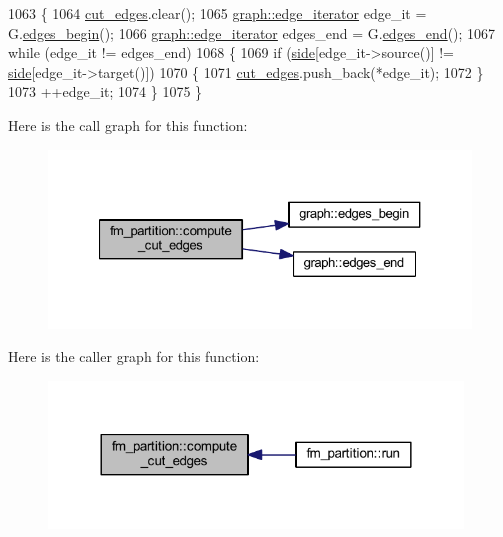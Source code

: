 \begin{DoxyCode}
1063 \{
1064     \mbox{\hyperlink{classfm__partition_ad71b58a8f73cc834d49304252fb4a288}{cut\_edges}}.clear();
1065     \mbox{\hyperlink{classgraph_a818d3766018eb0af91d520ce2150203c}{graph::edge\_iterator}} edge\_it = G.\mbox{\hyperlink{classgraph_a7ba35a4c4e8343ffb27ed6d9703c6f18}{edges\_begin}}();
1066     \mbox{\hyperlink{classgraph_a818d3766018eb0af91d520ce2150203c}{graph::edge\_iterator}} edges\_end = G.\mbox{\hyperlink{classgraph_aea8d7f976b85b6137f52d915e26639f6}{edges\_end}}();
1067     \textcolor{keywordflow}{while} (edge\_it != edges\_end)
1068     \{
1069     \textcolor{keywordflow}{if} (\mbox{\hyperlink{classfm__partition_af83309e781e9658fc0ff923ced087bfc}{side}}[edge\_it->source()] != \mbox{\hyperlink{classfm__partition_af83309e781e9658fc0ff923ced087bfc}{side}}[edge\_it->target()])
1070     \{
1071         \mbox{\hyperlink{classfm__partition_ad71b58a8f73cc834d49304252fb4a288}{cut\_edges}}.push\_back(*edge\_it);
1072     \}
1073     ++edge\_it;
1074     \}
1075 \}
\end{DoxyCode}
Here is the call graph for this function\+:\nopagebreak
\begin{figure}[H]
\begin{center}
\leavevmode
\includegraphics[width=327pt]{classfm__partition_a03c76998f985593caddc4979a28b9042_cgraph}
\end{center}
\end{figure}
Here is the caller graph for this function\+:\nopagebreak
\begin{figure}[H]
\begin{center}
\leavevmode
\includegraphics[width=312pt]{classfm__partition_a03c76998f985593caddc4979a28b9042_icgraph}
\end{center}
\end{figure}
\mbox{\label{classfm__partition_a5d0f409b6b1d554a62d67952236c7ce9}} 
